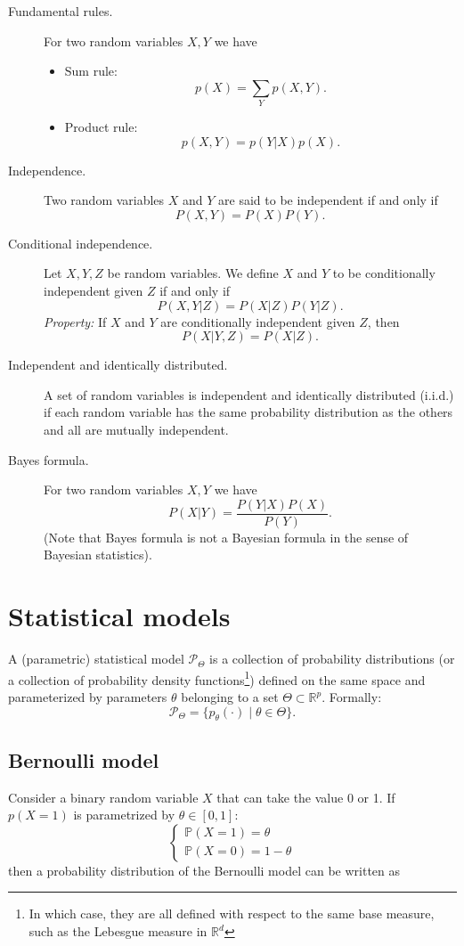 \documentclass[12pt]{report}	%
\def\RR{\mathbb{R}}
\def\PP{\mathbb{P}}
\begin{document}
\begin{description}
\item[Fundamental rules.] For two random variables $X,Y$ we have
\begin{itemize}
\item Sum rule: $$p(X)=\sum_{Y}p(X,Y).$$
\item Product rule: $$p(X,Y)=p(Y|X)p(X).$$
\end{itemize}
\item[Independence.] Two random variables $X$ and $Y$ are said to be independent if and only if $$P (X,Y) = P(X) P(Y).$$
\item[Conditional independence.] Let $X,Y,Z$ be random variables. We define $X$ and $Y$ to be conditionally independent given $Z$ if and only if $$P (X,Y | Z)=P(X|Z)P(Y|Z).$$
\textit{Property:} If $X$ and $Y$ are conditionally independent given $Z$, then $$P(X|Y,Z)=P (X|Z).$$
\item[Independent and identically distributed.] A set of random variables is independent and identically distributed (i.i.d.) if each random variable has the same probability distribution as the others and all are mutually independent.
\item[Bayes formula.] For two random variables $X, Y$ we have $$P(X|Y)= \frac{P(Y|X)P(X)}{P(Y)}.$$
(Note that Bayes formula is not a Bayesian formula in the sense of Bayesian statistics).
\end{description}

\section{Statistical models}
\begin{definition}
A (parametric) statistical model $\mathcal{P}_{\Theta}$ is a collection of probability distributions (or a collection of probability density functions\footnote{In which case, they are all defined with respect to the same base measure, such as the Lebesgue measure in $\RR^d$}) defined on the same space and parameterized by parameters $\theta$ belonging to a set $\Theta \subset \RR^p$. Formally:
$$\mathcal{P}_{\Theta}=\{p_\theta(\cdot) \mid \theta \in \Theta\}.$$
\end{definition}

\subsection{Bernoulli model}
Consider a binary random variable $X$ that can take the value 0 or 1. If $p(X=1)$ is parametrized by $\theta \in [0,1]$:
\begin{displaymath}
\left\{
    \begin{array}{ll}
        \PP(X=1)=\theta\\
        \PP(X=0)=1-\theta
    \end{array}
\right.
\end{displaymath}
then a probability distribution of the Bernoulli model can be written as
\end{document}
